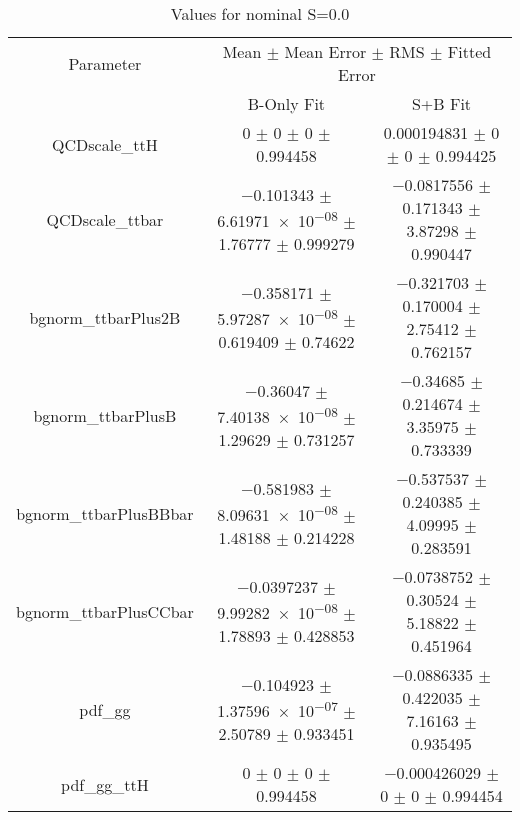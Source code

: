 \begin{table}
\centering
\caption{Values for nominal S=0.0}
\begin{tabular}{ccc}
\toprule
Parameter & \multicolumn{2}{c}{Mean $\pm$ Mean Error $\pm$ RMS $\pm$ Fitted Error}\\
 & B-Only Fit & S+B Fit\\
\midrule
QCDscale\_ttH & \num{0} $\pm$ \num{0} $\pm$ \num{0} $\pm$ \num{0.994458} & \num{0.000194831} $\pm$ \num{0} $\pm$ \num{0} $\pm$ \num{0.994425}\\
QCDscale\_ttbar & \num{-0.101343} $\pm$ \num{6.61971e-08} $\pm$ \num{1.76777} $\pm$ \num{0.999279} & \num{-0.0817556} $\pm$ \num{0.171343} $\pm$ \num{3.87298} $\pm$ \num{0.990447}\\
bgnorm\_ttbarPlus2B & \num{-0.358171} $\pm$ \num{5.97287e-08} $\pm$ \num{0.619409} $\pm$ \num{0.74622} & \num{-0.321703} $\pm$ \num{0.170004} $\pm$ \num{2.75412} $\pm$ \num{0.762157}\\
bgnorm\_ttbarPlusB & \num{-0.36047} $\pm$ \num{7.40138e-08} $\pm$ \num{1.29629} $\pm$ \num{0.731257} & \num{-0.34685} $\pm$ \num{0.214674} $\pm$ \num{3.35975} $\pm$ \num{0.733339}\\
bgnorm\_ttbarPlusBBbar & \num{-0.581983} $\pm$ \num{8.09631e-08} $\pm$ \num{1.48188} $\pm$ \num{0.214228} & \num{-0.537537} $\pm$ \num{0.240385} $\pm$ \num{4.09995} $\pm$ \num{0.283591}\\
bgnorm\_ttbarPlusCCbar & \num{-0.0397237} $\pm$ \num{9.99282e-08} $\pm$ \num{1.78893} $\pm$ \num{0.428853} & \num{-0.0738752} $\pm$ \num{0.30524} $\pm$ \num{5.18822} $\pm$ \num{0.451964}\\
pdf\_gg & \num{-0.104923} $\pm$ \num{1.37596e-07} $\pm$ \num{2.50789} $\pm$ \num{0.933451} & \num{-0.0886335} $\pm$ \num{0.422035} $\pm$ \num{7.16163} $\pm$ \num{0.935495}\\
pdf\_gg\_ttH & \num{0} $\pm$ \num{0} $\pm$ \num{0} $\pm$ \num{0.994458} & \num{-0.000426029} $\pm$ \num{0} $\pm$ \num{0} $\pm$ \num{0.994454}\\
\bottomrule
\end{tabular}
\end{table}